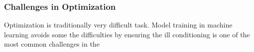 \subsubsection{Challenges in Optimization}

Optimization is traditionally very difficult task. Model training in machine learning avoids some the difficulties by ensuring
the ill conditioning is one of the most common challenges in the 